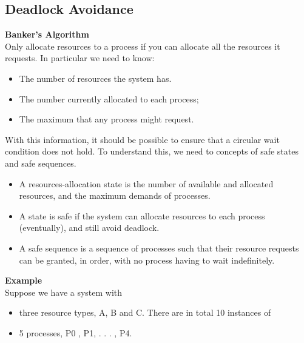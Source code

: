 \documentclass[a4paper, 10pt]{article}
\begin{document}
\subsection{Deadlock Avoidance}
\textbf{Banker's Algorithm} \\
Only allocate resources to a process if you can allocate all the resources it requests. In particular we need to know:
\begin{itemize}
    \item The number of resources the system has.
    \item The number currently allocated to each process;
    \item The maximum that any process might request.
\end{itemize}
With this information, it should be possible to ensure that a circular wait condition does not hold. To understand this, we need to concepts of safe states and safe sequences.
\begin{itemize}
    \item A resources-allocation state is the number of available and allocated resources, and the maximum demands of processes.
    \item A state is safe if the system can allocate resources to each process (eventually), and still avoid deadlock.
    \item A safe sequence is a sequence of processes such that their resource requests can be granted, in order, with no process having to wait indefinitely.
\end{itemize}
\textbf{Example} \\
Suppose we have a system with
\begin{itemize}
    \item three resource types, A, B and C. There are in total 10 instances of
    \item  5 processes, P0 , P1, . . . , P4.
\end{itemize}
\end{document}
